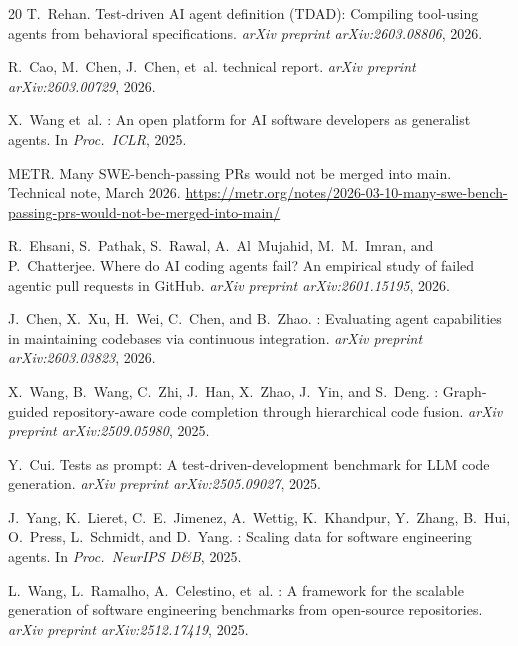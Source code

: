 \documentclass[sigconf,nonacm]{acmart}
\begin{document}
{\begin{thebibliography}{20}
T.~Rehan.
\newblock Test-driven {AI} agent definition ({TDAD}): Compiling tool-using
agents from behavioral specifications.
\newblock \emph{arXiv preprint arXiv:2603.08806}, 2026.

R.~Cao, M.~Chen, J.~Chen, et~al.
 technical report.
\newblock \emph{arXiv preprint arXiv:2603.00729}, 2026.

X.~Wang et~al.
: An open platform for {AI} software developers as
generalist agents.
\newblock In \emph{Proc.\ ICLR}, 2025.

{METR}.
\newblock Many {SWE}-bench-passing {PRs} would not be merged into main.
\newblock Technical note, March 2026.
\newblock \url{https://metr.org/notes/2026-03-10-many-swe-bench-passing-prs-would-not-be-merged-into-main/}

R.~Ehsani, S.~Pathak, S.~Rawal, A.~Al~Mujahid, M.~M.~Imran, and
P.~Chatterjee.
\newblock Where do {AI} coding agents fail? {An} empirical study of failed
agentic pull requests in {GitHub}.
\newblock \emph{arXiv preprint arXiv:2601.15195}, 2026.

J.~Chen, X.~Xu, H.~Wei, C.~Chen, and B.~Zhao.
: Evaluating agent capabilities in maintaining codebases
via continuous integration.
\newblock \emph{arXiv preprint arXiv:2603.03823}, 2026.

X.~Wang, B.~Wang, C.~Zhi, J.~Han, X.~Zhao, J.~Yin, and S.~Deng.
: Graph-guided repository-aware code completion through
hierarchical code fusion.
\newblock \emph{arXiv preprint arXiv:2509.05980}, 2025.

Y.~Cui.
\newblock Tests as prompt: A test-driven-development benchmark for {LLM}
code generation.
\newblock \emph{arXiv preprint arXiv:2505.09027}, 2025.

J.~Yang, K.~Lieret, C.~E.~Jimenez, A.~Wettig, K.~Khandpur, Y.~Zhang,
B.~Hui, O.~Press, L.~Schmidt, and D.~Yang.
: Scaling data for software engineering agents.
\newblock In \emph{Proc.\ NeurIPS D\&B}, 2025.

L.~Wang, L.~Ramalho, A.~Celestino, et~al.
: A framework for the scalable generation of software
engineering benchmarks from open-source repositories.
\newblock \emph{arXiv preprint arXiv:2512.17419}, 2025.

\end{thebibliography}
}
\end{document}
